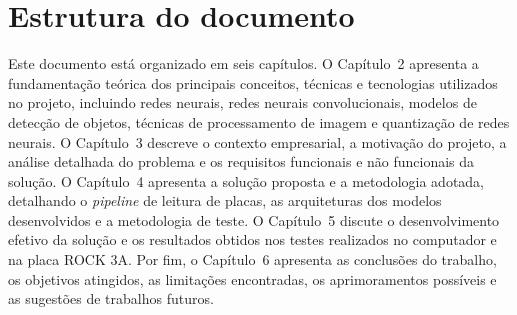 \section{Estrutura do documento}

Este documento está organizado em seis capítulos. O Capítulo~2 apresenta a fundamentação teórica dos principais conceitos, técnicas e tecnologias utilizados no projeto, incluindo redes neurais, redes neurais convolucionais, modelos de detecção de objetos, técnicas de processamento de imagem e quantização de redes neurais. O Capítulo~3 descreve o contexto empresarial, a motivação do projeto, a análise detalhada do problema e os requisitos funcionais e não funcionais da solução. O Capítulo~4 apresenta a solução proposta e a metodologia adotada, detalhando o \textit{pipeline} de leitura de placas, as arquiteturas dos modelos desenvolvidos e a metodologia de teste. O Capítulo~5 discute o desenvolvimento efetivo da solução e os resultados obtidos nos testes realizados no computador e na placa ROCK 3A. Por fim, o Capítulo~6 apresenta as conclusões do trabalho, os objetivos atingidos, as limitações encontradas, os aprimoramentos possíveis e as sugestões de trabalhos futuros.